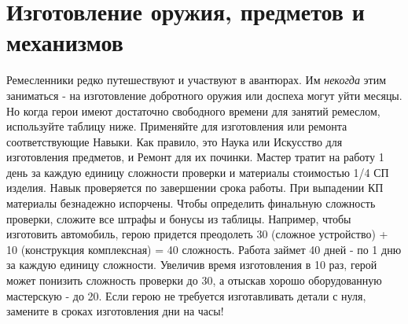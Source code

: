 \section{Изготовление оружия, предметов и механизмов}
Ремесленники редко путешествуют и участвуют в авантюрах. Им \textit{некогда} этим заниматься - на изготовление добротного оружия или доспеха могут уйти месяцы. Но когда герои имеют достаточно свободного времени для занятий ремеслом, используйте таблицу ниже. Применяйте для изготовления или ремонта соответствующие Навыки. Как правило, это Наука или Искусство для изготовления предметов, и Ремонт для их починки.
\newline Мастер тратит на работу 1 день за каждую единицу сложности проверки и материалы стоимостью 1/4 СП изделия. Навык проверяется по завершении срока работы. При выпадении КП материалы безнадежно испорчены. 
\newline Чтобы определить финальную сложность проверки, сложите все штрафы и бонусы из таблицы. Например, чтобы изготовить автомобиль, герою придется преодолеть 30 (сложное устройство) + 10 (конструкция комплексная) = 40 сложность. Работа займет 40 дней - по 1 дню за каждую единицу сложности. Увеличив время изготовления в 10 раз, герой может понизить сложность проверки до 30, а отыскав хорошо оборудованную мастерскую - до 20.
\newline Если герою не требуется изготавливать детали с нуля, замените в сроках изготовления дни на часы!
